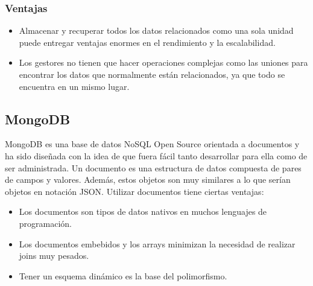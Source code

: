 \documentclass[preprint,12pt]{elsarticle}
\begin{document}
\subsubsection{\textbf{Ventajas}}
\begin{itemize}

\item Almacenar y recuperar todos los datos relacionados como una sola unidad puede entregar ventajas enormes en el rendimiento y la escalabilidad.
\item Los gestores no tienen que hacer operaciones complejas como las uniones para encontrar los datos que normalmente están relacionados, ya que todo se encuentra en un mismo lugar.

\end{itemize}
\cite{BDnoSQLMongodb}
\subsection {\textbf{MongoDB}}
MongoDB es una base de datos NoSQL Open Source orientada a documentos y ha sido diseñada con la idea de que fuera fácil tanto desarrollar para ella como de ser administrada. Un documento es una estructura de datos compuesta de pares de campos y valores. Además, estos objetos son muy similares a lo que serían objetos en notación JSON. \newline
Utilizar documentos tiene ciertas ventajas:
\begin{itemize}

\item Los documentos son tipos de datos nativos en muchos lenguajes de programación.
\item Los documentos embebidos y los arrays minimizan la necesidad de realizar joins muy pesados.
\item Tener un esquema dinámico es la base del polimorfismo.

\end{itemize}
 \cite{MongoDB}
\end{document}
